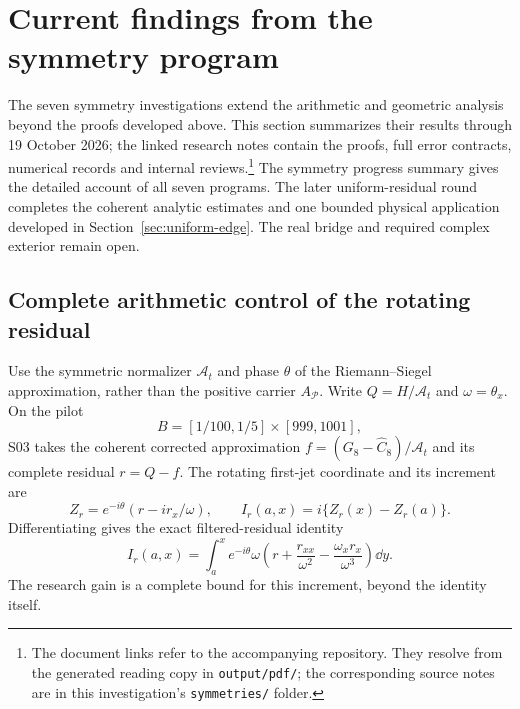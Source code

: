 \section{Current findings from the symmetry program}
\label{sec:symmetry-findings}

The seven symmetry investigations extend the arithmetic and geometric
analysis beyond the proofs developed above. This section summarizes their
results through 19 October 2026; the linked research notes contain the
proofs, full error contracts, numerical records and internal reviews.\footnote{The
document links refer to the accompanying repository. They resolve from
the generated reading copy in \texttt{output/pdf/}; the corresponding
source notes are in this investigation's \texttt{symmetries/} folder.}
The 
{symmetry progress summary} gives the detailed account of all seven
programs. The later
{uniform-residual round} completes the coherent analytic estimates and
one bounded physical application developed in
Section~\ref{sec:uniform-edge}. The real bridge and required complex
exterior remain open.

\subsection{Complete arithmetic control of the rotating residual}

Use the symmetric normalizer $\mathcal A_t$ and phase $\theta$ of the
Riemann--Siegel approximation, rather than the positive carrier
$A_{\mathcal P}$. Write $Q=H/\mathcal A_t$ and $\omega=\theta_x$.
On the pilot
\[
 B=[1/100,1/5]\times[999,1001],
\]
S03 takes the coherent corrected approximation
$f=(G_8-\widehat C_8)/\mathcal A_t$ and its complete residual $r=Q-f$.
The rotating first-jet coordinate and its increment are
\[
 Z_r=e^{-i\theta}(r-i r_x/\omega),\qquad
 I_r(a,x)=i\{Z_r(x)-Z_r(a)\}.
\]
Differentiating gives the exact filtered-residual identity
\[
 I_r(a,x)=\int_a^x e^{-i\theta}\omega
 \left(r+\frac{r_{xx}}{\omega^2}
             -\frac{\omega_x r_x}{\omega^3}\right)\dd y.
\]
The research gain is a complete bound for this increment, beyond the
identity itself.

